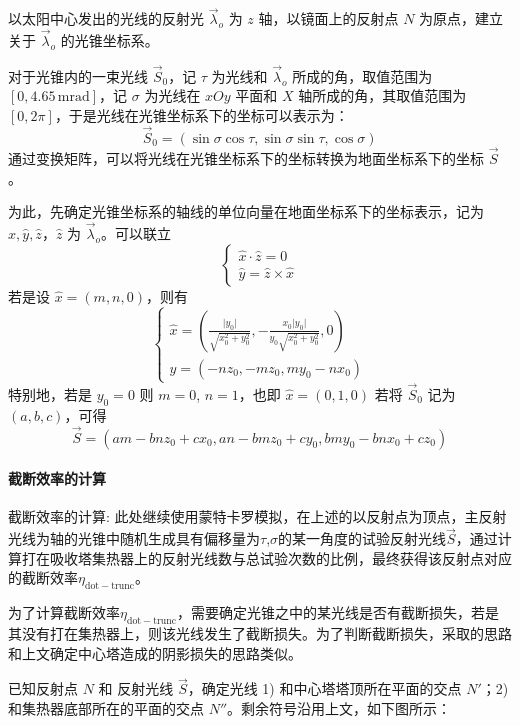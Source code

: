 \documentclass[../main.tex]{subfiles}
\begin{document}
以太阳中心发出的光线的反射光 \(\vec\lambda _{o} \) 为 \(z\) 轴，以镜面上的反射点 \(N\) 为原点，建立关于 \(\vec \lambda _{o}\) 的光锥坐标系。

对于光锥内的一束光线 \(\vec S _{0}\)，记 \(\tau\) 为光线和 \(\vec\lambda _{o}\) 所成的角，取值范围为 \([0, 4.65\, \mathrm{m}\mathrm{rad}]\)，记 \(\sigma\) 为光线在 \(xOy\) 平面和 \(X\) 轴所成的角，其取值范围为 \([0 , 2\pi]\)，于是光线在光锥坐标系下的坐标可以表示为：
\[
\vec S _{0} = (\sin \sigma \cos \tau, \sin \sigma \sin \tau, \cos \sigma)
\]
通过变换矩阵，可以将光线在光锥坐标系下的坐标转换为地面坐标系下的坐标 \(\vec S\)。

为此，先确定光锥坐标系的轴线的单位向量在地面坐标系下的坐标表示，记为 \(\hat x, \hat y, \hat z\)，\(\hat z\) 为 \(\vec \lambda _{o}\)。可以联立
\[
\begin{cases}
\hat x \cdot \hat z = 0\\
\hat y = \hat z \times \hat x
\end{cases}
\]
若是设 \(\hat x = (m , n , 0)\)，则有
\[
\begin{cases}
\displaystyle\hat x = \left(\frac{\vert y_{0} \vert}{\sqrt{x_{0}^{2}+ y _{0} ^{2}}}, {-}\frac{x_{0}\vert y_{0} \vert}{y_{0}\sqrt{x_{0}^{2}+y_{0}^{2}}}, 0\right)\\
\displaystyle \hat y = ({-} n z_{0}, - m z_{0} , my_{0} - n x_{0})
\end{cases}
\]
特别地，若是 \(y_{0} = 0\) 则 \(m = 0 \), \(n=1\)，也即 \(\hat x  = (0,1,0)\)
若将 \(\vec S_{0}\) 记为 \((a,b ,c)\)，可得
\begin{equation}
\vec S = (am - b nz _{0}+ c x_{0}, an - bmz_{0} + cy_{0}, bmy_{0} - bnx _{0} + cz_{0})
\end{equation}

\paragraph{截断效率的计算}
截断效率的计算: 此处继续使用蒙特卡罗模拟，在上述的以反射点为顶点，主反射光线为轴的光锥中随机生成具有偏移量为\(\tau\),\(\sigma\)的某一角度的试验反射光线\(\vec S\)，通过计算打在吸收塔集热器上的反射光线数与总试验次数的比例，最终获得该反射点对应的截断效率\(\eta _{\mathrm{dot}{-}\mathrm{trunc}}\)。

为了计算截断效率\(\eta _{\mathrm{dot-trunc}}\)，需要确定光锥之中的某光线是否有截断损失，若是其没有打在集热器上，则该光线发生了截断损失。为了判断截断损失，采取的思路和上文确定中心塔造成的阴影损失的思路类似。

已知反射点 \(N\) 和 反射光线 \(\vec S\)，确定光线 1) 和中心塔塔顶所在平面的交点 \(N'\)；2) 和集热器底部所在的平面的交点 \(N''\)。剩余符号沿用上文，如下图所示：
\end{document}
